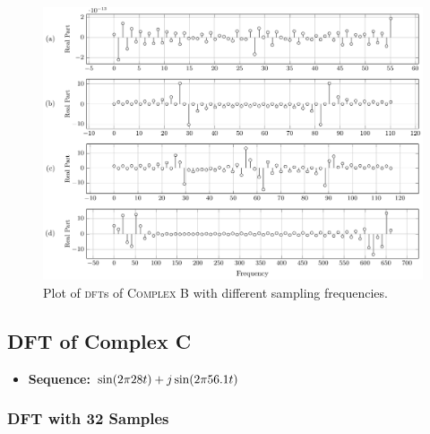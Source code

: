 \documentclass[../../course]{subfiles}
\begin{document}
\vfill

\begin{figure} [H]
    \centering
     {
        \includegraphics[height = 0.8\textheight] {tikzpics/plotDftComplexB64.pdf}
    }
     {Plot of \textsc{dft}s of \textsc{Complex B} with different sampling frequencies.}
    \label{plt:dftCplxB64}
\end{figure}

\pagebreak

\subsection{DFT of Complex C} \label{ssec:dftCplxC}

\begin{itemize} [label=]

    \item \textbf{Sequence:} $\sin(2 \pi 28 t) + j \sin(2 \pi 56.1 t)$

\end{itemize}

\subsubsection{DFT with 32 Samples}
\end{document}
